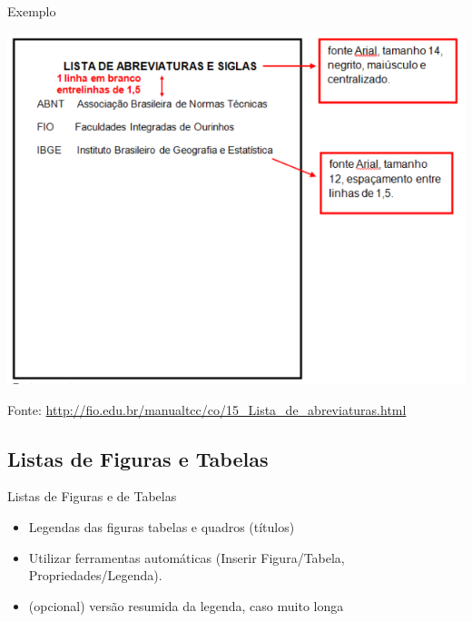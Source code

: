 \documentclass{beamer}
\begin{document}
\begin{frame}{\scriptsize }
  \begin{exampleblock}{Exemplo}
    \begin{center}
      \includegraphics[height=0.8\textheight]{EstruturaII/lista_abreviaturas}
    \end{center}
  \end{exampleblock}

  \vfill
  \scriptsize
  \hfill Fonte: {\tiny \url{http://fio.edu.br/manualtcc/co/15_Lista_de_abreviaturas.html}}
\end{frame}

\subsection{Listas de Figuras e Tabelas}

\begin{frame}{\scriptsize Listas de Figuras e de Tabelas}
  \begin{itemize}
    \footnotesize
  \item Legendas das figuras tabelas e quadros ({\tiny títulos})
    \bigskip
  \item Utilizar ferramentas automáticas ({\tiny Inserir Figura/Tabela,
    Propriedades/Legenda}).
    \bigskip
  \item ({\tiny opcional}) versão resumida da legenda, caso muito longa
  \end{itemize}
\end{frame}
\end{document}
